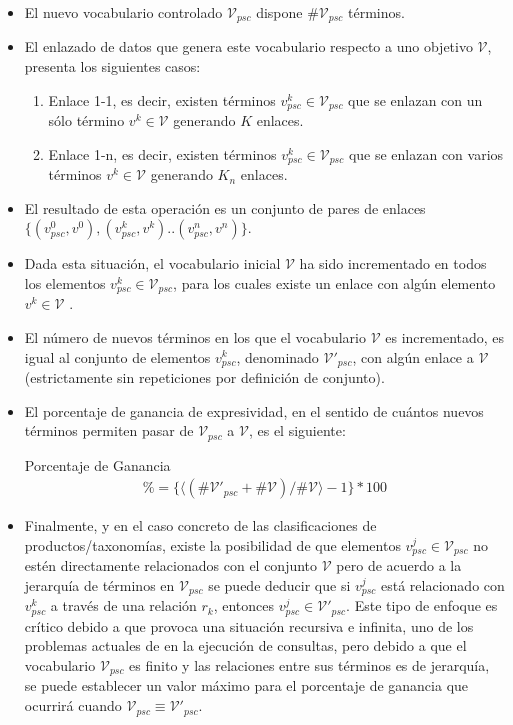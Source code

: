 \begin{itemize}
 \item El nuevo vocabulario controlado $\mathcal{V}_{psc}$ dispone $\#\mathcal{V}_{psc}$ términos.
 \item El enlazado de datos que genera este vocabulario respecto a uno objetivo $\mathcal{V}$, presenta los siguientes
casos:
\begin{enumerate}
 \item Enlace 1-1, es decir, existen términos $v^k_{psc} \in \mathcal{V}_{psc}$ que se enlazan con un sólo término $v^k \in \mathcal{V}$ 
generando $K$ enlaces.
 \item Enlace 1-n, es decir, existen términos $v^k_{psc} \in \mathcal{V}_{psc}$ que se enlazan con varios términos $v^k \in \mathcal{V}$ 
generando $K_n$ enlaces.
\end{enumerate}
\item El resultado de esta operación es un conjunto de pares de enlaces $\{ (v^0_{psc},v^0), (v^k_{psc},v^k)..(v^n_{psc},v^n) \}$.
\item Dada esta situación, el vocabulario inicial $\mathcal{V}$ ha sido incrementado en todos los elementos $v^k_{psc} \in \mathcal{V}_{psc}$, 
para los cuales existe un enlace con algún elemento $v^k \in \mathcal{V}$ .
\item El número de nuevos términos en los que el vocabulario $\mathcal{V}$ es incrementado, es igual al conjunto 
de elementos $v^k_{psc}$, denominado  $\mathcal{V'}_{psc}$, con algún enlace a $\mathcal{V}$ (estrictamente sin repeticiones por definición de conjunto).
\item El porcentaje de ganancia de expresividad, en el sentido de cuántos nuevos términos permiten pasar de $\mathcal{V}_{psc}$ a 
$\mathcal{V}$, es el siguiente:

\begin{definition}{Porcentaje de Ganancia}
\begin{align}
\% =  \{ \langle (\#\mathcal{V'}_{psc}+\#\mathcal{V}) / \#\mathcal{V} \rangle - 1 \} * 100
\end{align}
\end{definition}

\item Finalmente, y en el caso concreto de las clasificaciones de productos/taxonomías, existe la posibilidad de que elementos 
$v^j_{psc} \in \mathcal{V}_{psc}$ no estén directamente relacionados con el conjunto $\mathcal{V}$ pero de acuerdo a la jerarquía 
de términos en $\mathcal{V}_{psc}$ se puede deducir que si $v^j_{psc}$ está relacionado con $v^k_{psc}$ a través de una relación $r_k$, 
entonces $v^j_{psc} \in \mathcal{V'}_{psc}$. Este tipo de enfoque es crítico debido a que provoca una situación recursiva e infinita, 
uno de los problemas actuales de \linkeddata en la ejecución de consultas, pero debido a que el vocabulario $\mathcal{V}_{psc}$ es 
finito y las relaciones entre sus términos es de jerarquía, se puede establecer un valor máximo para el porcentaje de 
ganancia que ocurrirá cuando $\mathcal{V}_{psc} \equiv \mathcal{V'}_{psc}$.

\end{itemize}

